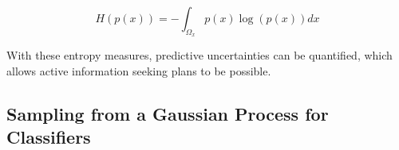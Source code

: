 			\begin{equation}
				H(p(x)) = - \int_{\Omega_{x}} p(x) \log(p(x)) dx
			\label{Background:GaussianProcess:Equation:ContinuousEntropy}
			\end{equation}
							
			With these entropy measures, predictive uncertainties can be quantified, which allows active information seeking plans to be possible.
			
		\subsection{Sampling from a Gaussian Process for Classifiers}
		

		


